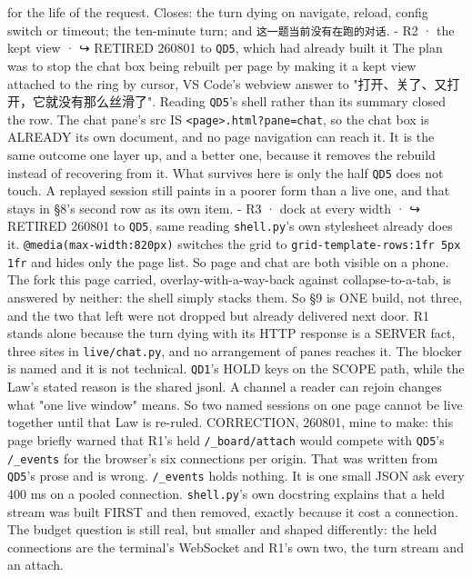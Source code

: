 for the life of the request. Closes: the turn dying on navigate, reload, config switch or timeout; the ten-minute turn; and \texttt{这一题当前没有在跑的对话}. - R2 · the kept view · ↪ RETIRED 260801 to \texttt{QD5}, which had already built it The plan was to stop the chat box being rebuilt per page by making it a kept view attached to the ring by cursor, VS Code's webview answer to "打开、关了、又打开，它就没有那么丝滑了". Reading \texttt{QD5}'s shell rather than its summary closed the row. The chat pane's src IS \texttt{<page>.html?pane=chat}, so the chat box is ALREADY its own document, and no page navigation can reach it. It is the same outcome one layer up, and a better one, because it removes the rebuild instead of recovering from it. What survives here is only the half \texttt{QD5} does not touch. A replayed session still paints in a poorer form than a live one, and that stays in §8's second row as its own item. - R3 · dock at every width · ↪ RETIRED 260801 to \texttt{QD5}, same reading \texttt{shell.py}'s own stylesheet already does it. \texttt{@media(max-width:820px)} switches the grid to \texttt{grid-template-rows:1fr 5px 1fr} and hides only the page list. So page and chat are both visible on a phone. The fork this page carried, overlay-with-a-way-back against collapse-to-a-tab, is answered by neither: the shell simply stacks them. So §9 is ONE build, not three, and the two that left were not dropped but already delivered next door. R1 stands alone because the turn dying with its HTTP response is a SERVER fact, three sites in \texttt{live/chat.py}, and no arrangement of panes reaches it. The blocker is named and it is not technical. \texttt{QD1}'s HOLD keys on the SCOPE path, while the Law's stated reason is the shared jsonl. A channel a reader can rejoin changes what "one live window" means. So two named sessions on one page cannot be live together until that Law is re-ruled. CORRECTION, 260801, mine to make: this page briefly warned that R1's held \texttt{/\_board/attach} would compete with \texttt{QD5}'s \texttt{/\_events} for the browser's six connections per origin. That was written from \texttt{QD5}'s prose and is wrong. \texttt{/\_events} holds nothing. It is one small JSON ask every 400 ms on a pooled connection. \texttt{shell.py}'s own docstring explains that a held stream was built FIRST and then removed, exactly because it cost a connection. The budget question is still real, but smaller and shaped differently: the held connections are the terminal's WebSocket and R1's own two, the turn stream and an attach.


